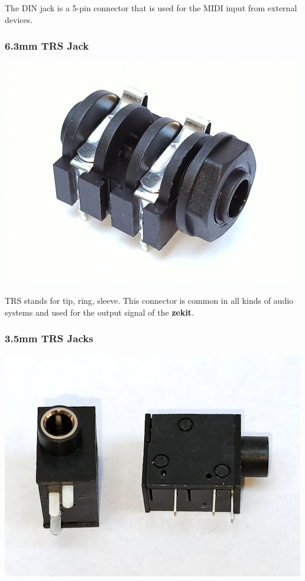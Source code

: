 \documentclass{scrartcl}
\begin{document}
The DIN jack is a 5-pin connector that is used for the MIDI input from external devices.

\subsubsection{6.3mm TRS Jack}

\begin{center}
    \includegraphics[scale=0.5]{assets/zekit-jack1-resized.jpg}
\end{center}

TRS stands for tip, ring, sleeve. This connector is common in all kinds of audio systems and used for the output signal of the \textbf{zekit}.

\subsubsection{3.5mm TRS Jacks}

\begin{center}
    \includegraphics[scale=0.5]{assets/zekit-jack2-resized.jpg}
\end{center}
\end{document}
